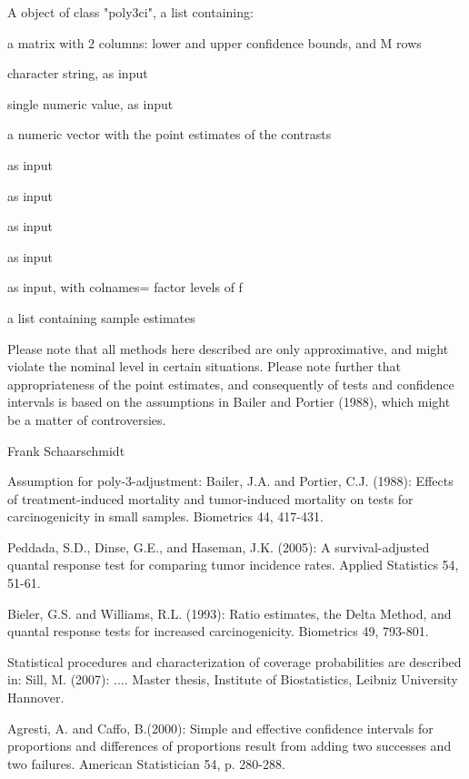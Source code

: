 \begin{Value}
A object of class "poly3ci", a list containing:
\begin{ldescription}
\item[\code{conf.int }] a matrix with 2 columns: lower and upper confidence bounds, and M rows
\item[\code{alternative }] character string, as input
\item[\code{conf.level}] single numeric value, as input
\item[\code{estimate}] a numeric vector with the point estimates of the contrasts
\item[\code{time}] as input
\item[\code{status}] as input
\item[\code{f}] as input
\item[\code{method}] as input
\item[\code{cmat}] as input, with colnames= factor levels of f
\item[\code{sample.est}] a list containing sample estimates
\end{ldescription}
\end{Value}
\begin{Note}\relax
Please note that all methods here described are only approximative, and might violate the nominal level in certain situations.
Please note further that appropriateness of the point estimates, and consequently of tests and confidence intervals is based on the assumptions in Bailer and Portier (1988),
which might be a matter of controversies.
\end{Note}
\begin{Author}\relax
Frank Schaarschmidt
\end{Author}
\begin{References}\relax
Assumption for poly-3-adjustment:
Bailer, J.A. and Portier, C.J. (1988):
Effects of treatment-induced mortality and tumor-induced mortality on tests for carcinogenicity in small samples.
Biometrics 44, 417-431.

Peddada, S.D., Dinse, G.E., and Haseman, J.K. (2005):
A survival-adjusted quantal response test for comparing tumor incidence rates.
Applied Statistics 54, 51-61.

Bieler, G.S. and Williams, R.L. (1993):
Ratio estimates, the Delta Method, and quantal response tests for increased carcinogenicity.
Biometrics 49, 793-801.

Statistical procedures and characterization of coverage probabilities are described in:
Sill, M. (2007):
....
Master thesis, Institute of Biostatistics, Leibniz University Hannover.

Agresti, A. and Caffo, B.(2000):
Simple and effective confidence intervals for proportions and differences of proportions result from adding two successes and two failures.
American Statistician 54, p. 280-288.
\end{References}
